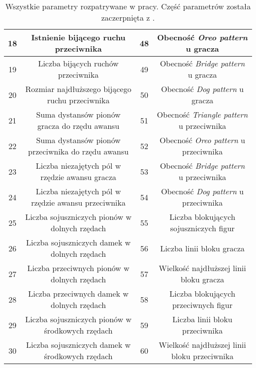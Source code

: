 {\begin{center}
\begin{table}
{\begin{tabular}{|c | c || c | c|}
 \hline
 18 & Istnienie bijącego ruchu przeciwnika & 48 & Obecność \textit{Oreo pattern} u gracza \\
 \hline
 19 & Liczba bijących ruchów przeciwnika & 49 & Obecność \textit{Bridge pattern} u gracza \\
 \hline
 20 & Rozmiar najdłuższego bijącego ruchu przeciwnika & 50 & Obecność \textit{Dog pattern} u gracza \\
 \hline
 21 & Suma dystansów pionów gracza do rzędu awansu & 51 & Obecność \textit{Triangle pattern} u przeciwnika \\ 
 \hline
 22 & Suma dystansów pionów przeciwnika do rzędu awansu & 52 & Obecność \textit{Oreo pattern} u przeciwnika \\
 \hline
 23 & Liczba niezajętych pól w rzędzie awansu gracza & 53 & Obecność \textit{Bridge pattern} u przeciwnika \\
 \hline
 24 & Liczba niezajętych pól w rzędzie awansu przeciwnika & 54 & Obecność \textit{Dog pattern} u przeciwnika \\
 \hline
 25 & Liczba sojuszniczych pionów w dolnych rzędach & 55 & Liczba blokujących sojuszniczych figur \\
 \hline
 26 & Liczba sojuszniczych damek w dolnych rzędach & 56 & Liczba linii bloku gracza \\ 
 \hline
 27 & Liczba przeciwnych pionów w dolnych rzędach & 57 & Wielkość najdłuższej linii bloku gracza \\
 \hline
 28 & Liczba przeciwnych damek w dolnych rzędach & 58 & Liczba blokujących przeciwnych figur \\
 \hline
 29 & Liczba sojuszniczych pionów w środkowych rzędach & 59 & Liczba linii bloku przeciwnika \\
 \hline
 30 & Liczba sojuszniczych damek w środkowych rzędach & 60 & Wielkość najdłuższej linii bloku przeciwnika \\
 \hline
\end{tabular}
}
\caption[ Parametry funkcji oceny heurystycznej ]{Wszystkie parametry rozpatrywane w pracy. Część parametrów została zaczerpnięta z \cite{EvoCheckers}.}
\label{tab:params}
\end{table}
\end{center}
}
